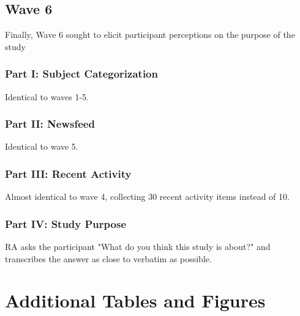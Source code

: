 \documentclass[12pt,letterpaper]{article}
\begin{document}
\subsection{Wave 6}

Finally, Wave 6 sought to elicit participant perceptions on the purpose of the study 

\subsubsection{Part I: Subject Categorization} Identical to waves 1-5.

\subsubsection{Part II: Newsfeed}  Identical to wave 5.

\subsubsection{Part III: Recent Activity} Almost identical to wave 4, collecting 30 recent activity items instead of 10.

\subsubsection{Part IV: Study Purpose} RA asks the participant "What do you think this study is about?" and transcribes the answer as close to verbatim as possible.

\section{Additional Tables and Figures}\label{app:tab_fig}
\end{document}
